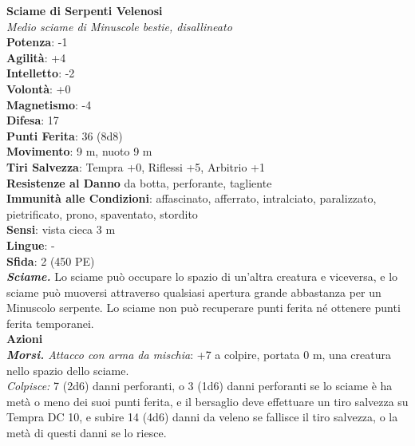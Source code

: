 \begin{multicols}{2}
\medskip\textbf{Sciame di Serpenti Velenosi}\\
\emph{Medio sciame di Minuscole bestie, disallineato}\\
\textbf{Potenza}: -1\\
\textbf{Agilità}: +4\\
\textbf{Intelletto}: -2\\
\textbf{Volontà}: +0\\
\textbf{Magnetismo}: -4\\
\textbf{Difesa}: 17\\
\textbf{Punti Ferita}: 36 (8d8)\\
\textbf{Movimento}: 9 m, nuoto 9 m\\
\textbf{Tiri Salvezza}: Tempra +0, Riflessi +5, Arbitrio +1\\
\textbf{Resistenze al Danno} da botta, perforante, tagliente\\
\textbf{Immunità alle Condizioni}: affascinato, afferrato, intralciato, paralizzato, pietrificato, prono, spaventato, stordito\\
\textbf{Sensi}: vista cieca 3 m\\
\textbf{Lingue}: -\\
\textbf{Sfida}: 2 (450 PE)\smallskip\\
\emph{\textbf{Sciame.}} Lo sciame può occupare lo spazio di un'altra creatura e viceversa, e lo sciame può muoversi attraverso qualsiasi apertura grande abbastanza per un Minuscolo serpente. Lo sciame non può recuperare punti ferita né ottenere punti ferita temporanei.\\
\smallskip\textbf{Azioni}\\
\emph{\textbf{Morsi.} Attacco con arma da mischia}: +7 a colpire, portata 0 m, una creatura nello spazio dello sciame.\\
\emph{Colpisce:} 7 (2d6) danni perforanti, o 3 (1d6) danni perforanti se lo sciame è ha metà o meno dei suoi punti ferita, e il bersaglio deve effettuare un tiro salvezza su Tempra DC 10, e subire 14 (4d6) danni da veleno se fallisce il tiro salvezza, o la metà di questi danni se lo riesce.\\


\end{multicols}
